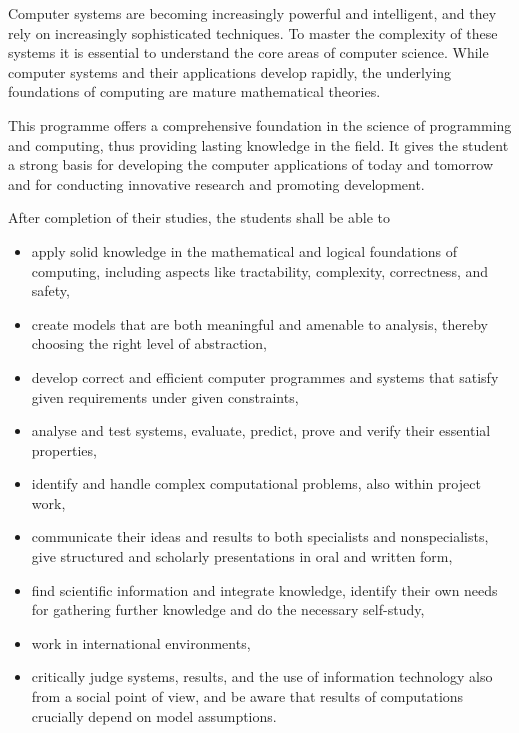 
Computer systems are becoming increasingly powerful and intelligent,
and they rely on increasingly sophisticated techniques. To master the
complexity of these systems it is essential to understand the core
areas of computer science. While computer systems and their
applications develop rapidly, the underlying foundations of computing
are mature mathematical theories.

This programme offers a comprehensive foundation in the science of
programming and computing, thus providing lasting knowledge in the
field. It gives the student a strong basis for developing the computer
applications of today and tomorrow and for conducting innovative
research and promoting development.

After completion of their studies, the students shall be able to
\begin{itemize}
\item apply solid knowledge in the mathematical and logical
  foundations of computing, including aspects like tractability,
  complexity, correctness, and safety,
\item create models that are both meaningful and amenable to analysis,
  thereby choosing the right level of abstraction,
\item develop correct and efficient computer programmes and systems
  that satisfy given requirements under given constraints,
\item analyse and test systems, evaluate, predict, prove and verify
  their essential properties,
\item identify and handle complex computational problems, also within
  project work,
\item communicate their ideas and results to both specialists and
  nonspecialists, give structured and scholarly presentations in oral
  and written form,
\item find scientific information and integrate knowledge, identify
  their own needs for gathering further knowledge and do the necessary
  self-study,
\item work in international environments,
\item critically judge systems, results, and the use of information
  technology also from a social point of view, and be aware that
  results of computations crucially depend on model assumptions.
\end{itemize}
